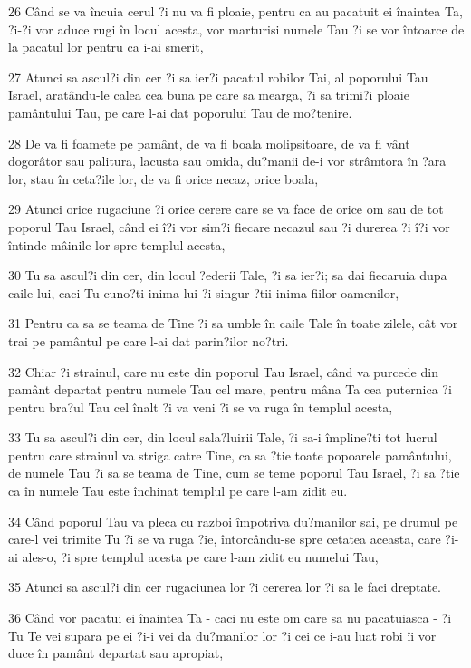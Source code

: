 \par 26 Când se va încuia cerul ?i nu va fi ploaie, pentru ca au pacatuit ei înaintea Ta, ?i-?i vor aduce rugi în locul acesta, vor marturisi numele Tau ?i se vor întoarce de la pacatul lor pentru ca i-ai smerit,
\par 27 Atunci sa ascul?i din cer ?i sa ier?i pacatul robilor Tai, al poporului Tau Israel, aratându-le calea cea buna pe care sa mearga, ?i sa trimi?i ploaie pamântului Tau, pe care l-ai dat poporului Tau de mo?tenire.
\par 28 De va fi foamete pe pamânt, de va fi boala molipsitoare, de va fi vânt dogorâtor sau palitura, lacusta sau omida, du?manii de-i vor strâmtora în ?ara lor, stau în ceta?ile lor, de va fi orice necaz, orice boala,
\par 29 Atunci orice rugaciune ?i orice cerere care se va face de orice om sau de tot poporul Tau Israel, când ei î?i vor sim?i fiecare necazul sau ?i durerea ?i î?i vor întinde mâinile lor spre templul acesta,
\par 30 Tu sa ascul?i din cer, din locul ?ederii Tale, ?i sa ier?i; sa dai fiecaruia dupa caile lui, caci Tu cuno?ti inima lui ?i singur ?tii inima fiilor oamenilor,
\par 31 Pentru ca sa se teama de Tine ?i sa umble în caile Tale în toate zilele, cât vor trai pe pamântul pe care l-ai dat parin?ilor no?tri.
\par 32 Chiar ?i strainul, care nu este din poporul Tau Israel, când va purcede din pamânt departat pentru numele Tau cel mare, pentru mâna Ta cea puternica ?i pentru bra?ul Tau cel înalt ?i va veni ?i se va ruga în templul acesta,
\par 33 Tu sa ascul?i din cer, din locul sala?luirii Tale, ?i sa-i împline?ti tot lucrul pentru care strainul va striga catre Tine, ca sa ?tie toate popoarele pamântului, de numele Tau ?i sa se teama de Tine, cum se teme poporul Tau Israel, ?i sa ?tie ca în numele Tau este închinat templul pe care l-am zidit eu.
\par 34 Când poporul Tau va pleca cu razboi împotriva du?manilor sai, pe drumul pe care-l vei trimite Tu ?i se va ruga ?ie, întorcându-se spre cetatea aceasta, care ?i-ai ales-o, ?i spre templul acesta pe care l-am zidit eu numelui Tau,
\par 35 Atunci sa ascul?i din cer rugaciunea lor ?i cererea lor ?i sa le faci dreptate.
\par 36 Când vor pacatui ei înaintea Ta - caci nu este om care sa nu pacatuiasca - ?i Tu Te vei supara pe ei ?i-i vei da du?manilor lor ?i cei ce i-au luat robi îi vor duce în pamânt departat sau apropiat,
